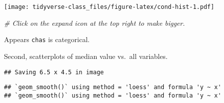 \documentclass[]{book}
\newenvironment{Shaded}{\begin{snugshade}}{\end{snugshade}}
\newcommand{\KeywordTok}[1]{\textcolor[rgb]{0.13,0.29,0.53}{\textbf{#1}}}
\newcommand{\DataTypeTok}[1]{\textcolor[rgb]{0.13,0.29,0.53}{#1}}
\newcommand{\FloatTok}[1]{\textcolor[rgb]{0.00,0.00,0.81}{#1}}
\newcommand{\StringTok}[1]{\textcolor[rgb]{0.31,0.60,0.02}{#1}}
\newcommand{\CommentTok}[1]{\textcolor[rgb]{0.56,0.35,0.01}{\textit{#1}}}
\newcommand{\OtherTok}[1]{\textcolor[rgb]{0.56,0.35,0.01}{#1}}
\newcommand{\OperatorTok}[1]{\textcolor[rgb]{0.81,0.36,0.00}{\textbf{#1}}}
\newcommand{\NormalTok}[1]{#1}
\begin{document}
\texttt{[image: tidyverse-class\_files/figure-latex/cond-hist-1.pdf]}

\begin{Shaded}
\begin{Highlighting}[]
\CommentTok{# Click on the expand icon at the top right to make bigger.}
\end{Highlighting}
\end{Shaded}

Appears \texttt{chas} is categorical.

\begin{Shaded}
\end{Shaded}

Second, scatterplots of median value vs.~all variables.

\begin{Shaded}
\end{Shaded}

\begin{verbatim}
## Saving 6.5 x 4.5 in image
\end{verbatim}

\begin{verbatim}
## `geom_smooth()` using method = 'loess' and formula 'y ~ x'
## `geom_smooth()` using method = 'loess' and formula 'y ~ x'
\end{verbatim}
\end{document}
